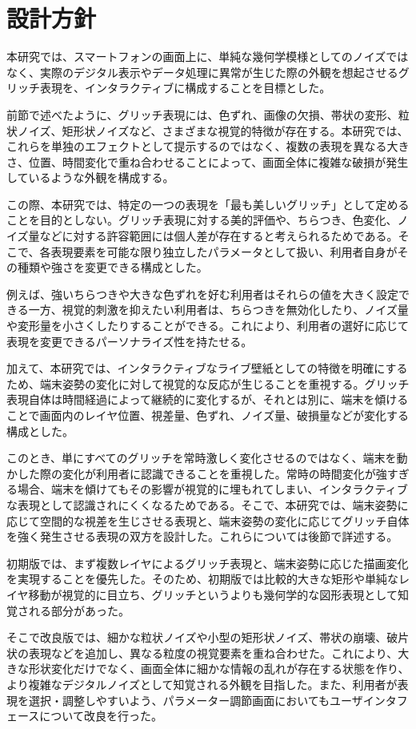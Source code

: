 \section{設計方針}

本研究では、スマートフォンの画面上に、単純な幾何学模様としてのノイズではなく、実際のデジタル表示やデータ処理に異常が生じた際の外観を想起させるグリッチ表現を、インタラクティブに構成することを目標とした。

前節で述べたように、グリッチ表現には、色ずれ、画像の欠損、帯状の変形、粒状ノイズ、矩形状ノイズなど、さまざまな視覚的特徴が存在する。本研究では、これらを単独のエフェクトとして提示するのではなく、複数の表現を異なる大きさ、位置、時間変化で重ね合わせることによって、画面全体に複雑な破損が発生しているような外観を構成する。

この際、本研究では、特定の一つの表現を「最も美しいグリッチ」として定めることを目的としない。グリッチ表現に対する美的評価や、ちらつき、色変化、ノイズ量などに対する許容範囲には個人差が存在すると考えられるためである。そこで、各表現要素を可能な限り独立したパラメータとして扱い、利用者自身がその種類や強さを変更できる構成とした。

例えば、強いちらつきや大きな色ずれを好む利用者はそれらの値を大きく設定できる一方、視覚的刺激を抑えたい利用者は、ちらつきを無効化したり、ノイズ量や変形量を小さくしたりすることができる。これにより、利用者の選好に応じて表現を変更できるパーソナライズ性を持たせる。

加えて、本研究では、インタラクティブなライブ壁紙としての特徴を明確にするため、端末姿勢の変化に対して視覚的な反応が生じることを重視する。グリッチ表現自体は時間経過によって継続的に変化するが、それとは別に、端末を傾けることで画面内のレイヤ位置、視差量、色ずれ、ノイズ量、破損量などが変化する構成とした。

このとき、単にすべてのグリッチを常時激しく変化させるのではなく、端末を動かした際の変化が利用者に認識できることを重視した。常時の時間変化が強すぎる場合、端末を傾けてもその影響が視覚的に埋もれてしまい、インタラクティブな表現として認識されにくくなるためである。そこで、本研究では、端末姿勢に応じて空間的な視差を生じさせる表現と、端末姿勢の変化に応じてグリッチ自体を強く発生させる表現の双方を設計した。これらについては後節で詳述する。

初期版では、まず複数レイヤによるグリッチ表現と、端末姿勢に応じた描画変化を実現することを優先した。そのため、初期版では比較的大きな矩形や単純なレイヤ移動が視覚的に目立ち、グリッチというよりも幾何学的な図形表現として知覚される部分があった。

そこで改良版では、細かな粒状ノイズや小型の矩形状ノイズ、帯状の崩壊、破片状の表現などを追加し、異なる粒度の視覚要素を重ね合わせた。これにより、大きな形状変化だけでなく、画面全体に細かな情報の乱れが存在する状態を作り、より複雑なデジタルノイズとして知覚される外観を目指した。また、利用者が表現を選択・調整しやすいよう、パラメーター調節画面においてもユーザインタフェースについて改良を行った。


